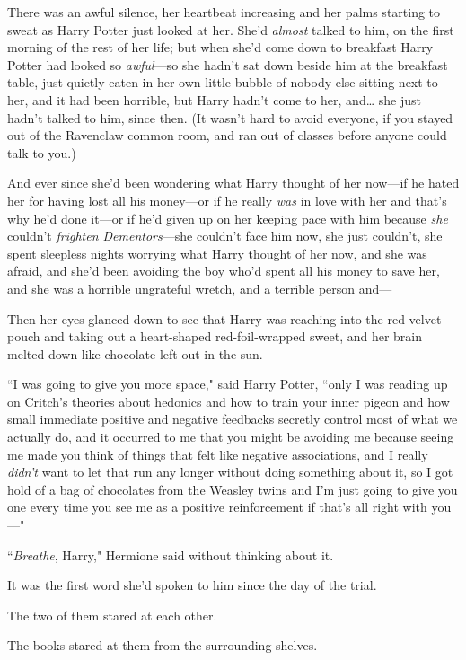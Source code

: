 There was an awful silence, her heartbeat increasing and her palms starting to sweat as Harry Potter just looked at her. She'd \emph{almost} talked to him, on the first morning of the rest of her life; but when she'd come down to breakfast Harry Potter had looked so \emph{awful}—so she hadn't sat down beside him at the breakfast table, just quietly eaten in her own little bubble of nobody else sitting next to her, and it had been horrible, but Harry hadn't come to her, and{\ldots} she just hadn't talked to him, since then. (It wasn't hard to avoid everyone, if you stayed out of the Ravenclaw common room, and ran out of classes before anyone could talk to you.)

And ever since she'd been wondering what Harry thought of her now—if he hated her for having lost all his money—or if he really \emph{was} in love with her and that's why he'd done it—or if he'd given up on her keeping pace with him because \emph{she} couldn't \emph{frighten Dementors}—she couldn't face him now, she just couldn't, she spent sleepless nights worrying what Harry thought of her now, and she was afraid, and she'd been avoiding the boy who'd spent all his money to save her, and she was a horrible ungrateful wretch, and a terrible person and—

Then her eyes glanced down to see that Harry was reaching into the red-velvet pouch and taking out a heart-shaped red-foil-wrapped sweet, and her brain melted down like chocolate left out in the sun.

``I was going to give you more space," said Harry Potter, ``only I was reading up on Critch's theories about hedonics and how to train your inner pigeon and how small immediate positive and negative feedbacks secretly control most of what we actually do, and it occurred to me that you might be avoiding me because seeing me made you think of things that felt like negative associations, and I really \emph{didn't} want to let that run any longer without doing something about it, so I got hold of a bag of chocolates from the Weasley twins and I'm just going to give you one every time you see me as a positive reinforcement if that's all right with you—"

``\emph{Breathe}, Harry," Hermione said without thinking about it.

It was the first word she'd spoken to him since the day of the trial.

The two of them stared at each other.

The books stared at them from the surrounding shelves.

